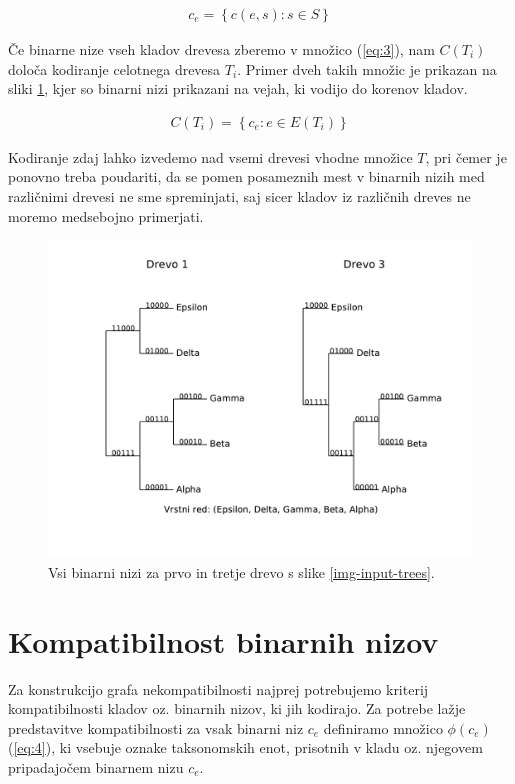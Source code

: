 \documentclass[a4paper, 12pt]{book}
\begin{document}
\begin{align}
	c_e = \left\{ c(e, s): s \in S \right\} \label{eq:2}
\end{align}

\noindent Če binarne nize vseh kladov drevesa zberemo v množico (\ref{eq:3}), 
nam $C(T_i)$ določa kodiranje celotnega drevesa $T_i$. Primer dveh takih množic
je prikazan na sliki \ref{img-bistring-trees-example}, kjer so binarni nizi 
prikazani na vejah, ki vodijo do korenov kladov.

\begin{align}
	C(T_i) = \left\{ c_e : e \in E(T_i) \right\} \label{eq:3}
\end{align}

\noindent Kodiranje zdaj lahko izvedemo nad vsemi drevesi vhodne množice $T$, pri čemer je 
ponovno treba poudariti, da se pomen posameznih mest v binarnih nizih med 
različnimi drevesi ne sme spreminjati, saj sicer kladov iz različnih dreves ne 
moremo medsebojno primerjati. 

\begin{figure}
	\begin{center}
		\includegraphics[scale=0.7, clip=true, trim=0 2cm 0 9mm]{gfx/bitstring_trees.pdf}
	\end{center}
	\caption{Vsi binarni nizi za prvo in tretje drevo s slike \ref{img-input-trees}.}
	\label{img-bistring-trees-example}
\end{figure}

\section{Kompatibilnost binarnih nizov} 
Za konstrukcijo grafa nekompatibilnosti najprej potrebujemo kriterij kompatibilnosti 
kladov oz. binarnih nizov, ki jih kodirajo. Za potrebe lažje predstavitve 
kompatibilnosti za vsak binarni niz $c_e$ definiramo množico $\phi(c_e)$ (\ref{eq:4}), 
ki vsebuje oznake taksonomskih enot, prisotnih v kladu oz. njegovem pripadajočem 
binarnem nizu $c_e$. 
\end{document}
